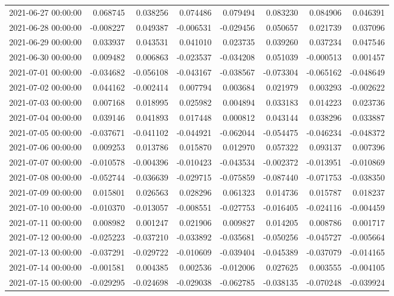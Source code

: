 \begin{tabular}{lrrrrrrr}
2021-06-27 00:00:00 & 0.068745 & 0.038256 & 0.074486 & 0.079494 & 0.083230 & 0.084906 & 0.046391 \\
2021-06-28 00:00:00 & -0.008227 & 0.049387 & -0.006531 & -0.029456 & 0.050657 & 0.021739 & 0.037096 \\
2021-06-29 00:00:00 & 0.033937 & 0.043531 & 0.041010 & 0.023735 & 0.039260 & 0.037234 & 0.047546 \\
2021-06-30 00:00:00 & 0.009482 & 0.006863 & -0.023537 & -0.034208 & 0.051039 & -0.000513 & 0.001457 \\
2021-07-01 00:00:00 & -0.034682 & -0.056108 & -0.043167 & -0.038567 & -0.073304 & -0.065162 & -0.048649 \\
2021-07-02 00:00:00 & 0.044162 & -0.002414 & 0.007794 & 0.003684 & 0.021979 & 0.003293 & -0.002622 \\
2021-07-03 00:00:00 & 0.007168 & 0.018995 & 0.025982 & 0.004894 & 0.033183 & 0.014223 & 0.023736 \\
2021-07-04 00:00:00 & 0.039146 & 0.041893 & 0.017448 & 0.000812 & 0.043144 & 0.038296 & 0.033887 \\
2021-07-05 00:00:00 & -0.037671 & -0.041102 & -0.044921 & -0.062044 & -0.054475 & -0.046234 & -0.048372 \\
2021-07-06 00:00:00 & 0.009253 & 0.013786 & 0.015870 & 0.012970 & 0.057322 & 0.093137 & 0.007396 \\
2021-07-07 00:00:00 & -0.010578 & -0.004396 & -0.010423 & -0.043534 & -0.002372 & -0.013951 & -0.010869 \\
2021-07-08 00:00:00 & -0.052744 & -0.036639 & -0.029715 & -0.075859 & -0.087440 & -0.071753 & -0.038350 \\
2021-07-09 00:00:00 & 0.015801 & 0.026563 & 0.028296 & 0.061323 & 0.014736 & 0.015787 & 0.018237 \\
2021-07-10 00:00:00 & -0.010370 & -0.013057 & -0.008551 & -0.027753 & -0.016405 & -0.024116 & -0.004459 \\
2021-07-11 00:00:00 & 0.008982 & 0.001247 & 0.021906 & 0.009827 & 0.014205 & 0.008786 & 0.001717 \\
2021-07-12 00:00:00 & -0.025223 & -0.037210 & -0.033892 & -0.035681 & -0.050256 & -0.045727 & -0.005664 \\
2021-07-13 00:00:00 & -0.037291 & -0.029722 & -0.010609 & -0.039404 & -0.045389 & -0.037079 & -0.014165 \\
2021-07-14 00:00:00 & -0.001581 & 0.004385 & 0.002536 & -0.012006 & 0.027625 & 0.003555 & -0.004105 \\
2021-07-15 00:00:00 & -0.029295 & -0.024698 & -0.029038 & -0.062785 & -0.038135 & -0.070248 & -0.039924 \\

\end{tabular}

